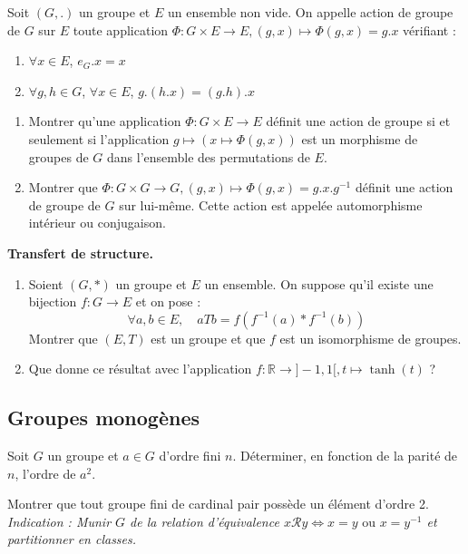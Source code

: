 \begin{exercice}
Soit $(G,.)$ un groupe et $E$ un ensemble non vide.
On appelle action de groupe de $G$ sur $E$ toute application $\Phi: G\times E \to E, (g,x) \mapsto \Phi(g,x)=g.x$ vérifiant :
\begin{enumerate}
    \item $\forall x\in E$, $e_{G}.x=x$
    \item $\forall g,h\in G$, $\forall x\in E$, $g.(h.x)=(g.h).x$
\end{enumerate}
\begin{enumerate}
    \item Montrer qu'une application $\Phi:G\times E\rightarrow E$ définit une action de groupe si et seulement si l'application $g\mapsto(x\mapsto\Phi(g,x))$ est un morphisme de groupes de $G$ dans l'ensemble des permutations de $E$.
    \item Montrer que $\Phi: G\times G \to G, (g,x) \mapsto \Phi(g,x)=g.x.g^{-1}$ définit une action de groupe de $G$ sur lui-même. Cette action est appelée automorphisme intérieur ou conjugaison.
\end{enumerate}
\end{exercice}

\begin{exercice}
\textbf{Transfert de structure.}
\begin{enumerate}
    \item Soient $(G,*)$ un groupe et $E$ un ensemble. On suppose qu'il existe une bijection $f:G\rightarrow E$ et on pose :
    $$ \forall a,b\in E, \quad a T b=f(f^{-1}(a)*f^{-1}(b)) $$
    Montrer que $(E,T)$ est un groupe et que $f$ est un isomorphisme de groupes.
    \item Que donne ce résultat avec l'application $f: \mathbb{R} \to ]-1,1[, t \mapsto \tanh(t)$ ?
\end{enumerate}
\end{exercice}

\subsection{Groupes monogènes}

\begin{exercice}
Soit $G$ un groupe et $a\in G$ d'ordre fini $n$.
Déterminer, en fonction de la parité de $n$, l'ordre de $a^{2}$.
\end{exercice}

\begin{exercice}
Montrer que tout groupe fini de cardinal pair possède un élément d'ordre 2.
\textit{Indication : Munir $G$ de la relation d'équivalence $x \mathcal{R} y \iff x=y \text{ ou } x=y^{-1}$ et partitionner en classes.}
\end{exercice}

